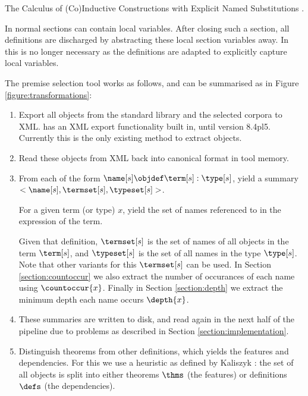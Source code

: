\begin{definition}[\acic]
	The Calculus of (Co)Inductive Constructions with Explicit Named Substitutions \cite{coen2000progettazione}.

	In normal \cic sections can contain local variables.
	After closing such a section, all definitions are discharged by abstracting these local section variables away.
	In \acic this is no longer necessary as the definitions are adapted to explicitly capture local variables.
\end{definition}

The premise selection tool works as follows, and can be summarised as in Figure \ref{figure:transformations}:
\begin{enumerate}
    \item Export all \coq objects from the standard library and the selected corpora to XML.
		\coq has an XML export functionality built in, until version 8.4pl5.
		Currently this is the only existing method to extract \coq objects.
	\item Read these objects from XML back into canonical \acic{} format in tool memory.
	\item From each \coqobj[s] of the form $\name[s] \objdef \term[s] : \type[s]$,
		yield a summary $<\name[s], \termset[s], \typeset[s]>$.
		\begin{definition}[$\flatten{x}$]
			For a given term (or type) $x$, yield the set of names referenced to in the expression of the term.
		\end{definition}
		Given that definition, $\termset[s]$ is the set of names of all objects in the term $\term[s]$,
		and $\typeset[s]$ is the set of all names in the type $\type[s]$.
		Note that other variants for this $\termset[s]$ can be used.
		In Section \ref{section:countoccur} we also extract the number of occurances of each name using $\countoccur{x}$.
		Finally in Section \ref{section:depth} we extract the minimum depth each name occurs $\depth{x}$.
	\item These summaries are written to disk, and read again in the next half of the pipeline due to problems as described in Section \ref{section:implementation}.
	\item Distinguish theorems from other definitions, which yields the features and dependencies.
		For this we use a heuristic as defined by Kaliszyk \cite{kaliszyk2014machine}:
		the set of all objects is split into either theorems $\thms$ (the features) or definitions $\defs$ (the dependencies).

\end{enumerate}
